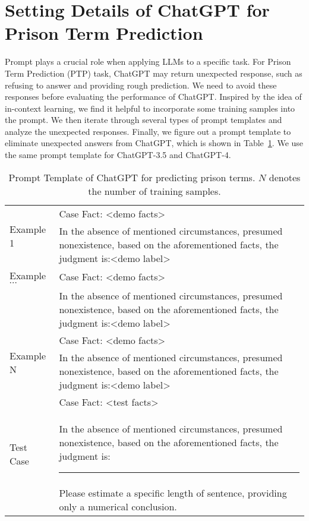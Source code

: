 \section{Setting Details of ChatGPT for Prison Term Prediction}
\label{sec:b}

Prompt plays a crucial role when applying LLMs to a specific task. For Prison Term Prediction (PTP) task, ChatGPT may return unexpected response, such as refusing to answer and providing rough prediction. We need to avoid these responses before evaluating the performance of ChatGPT. Inspired by the idea of in-context learning, we find it helpful to incorporate some training samples into the prompt. We then iterate through several types of prompt templates and analyze the unexpected responses. Finally, we figure out a prompt template to eliminate unexpected answers from ChatGPT, which is shown in Table~\ref{tab:gpt_input}. We use the same prompt template for ChatGPT-3.5 and ChatGPT-4.

\begin{table}
    \centering
    \small
    \begin{tabular}{p{}|p{}}
    \toprule
       \multirow{2}{*}{Example 1}  & Case Fact: <demo facts>\\
       & In the absence of mentioned circumstances, presumed nonexistence, based on the aforementioned facts, the judgment is:<demo label>\\
       \multirow{1}{*}{Example $\cdots$}  & Case Fact: <demo facts>\\
       & In the absence of mentioned circumstances, presumed nonexistence, based on the aforementioned facts, the judgment is:<demo label>\\
       \multirow{2}{*}{Example N}  & Case Fact: <demo facts>\\
       & In the absence of mentioned circumstances, presumed nonexistence, based on the aforementioned facts, the judgment is:<demo label>\\
       \multirow{3}{*}{Test Case}  & Case Fact: <test facts>\\
       & In the absence of mentioned circumstances, presumed nonexistence, based on the aforementioned facts, the judgment is:\rule{1cm}{0.4pt}\\
       & Please estimate a specific length of sentence, providing only a numerical conclusion.\\
       \bottomrule
    \end{tabular}
    \caption{Prompt Template of ChatGPT for predicting prison terms. $N$ denotes the number of training samples.}
    \label{tab:gpt_input}
    \vspace{-1em}
\end{table}


